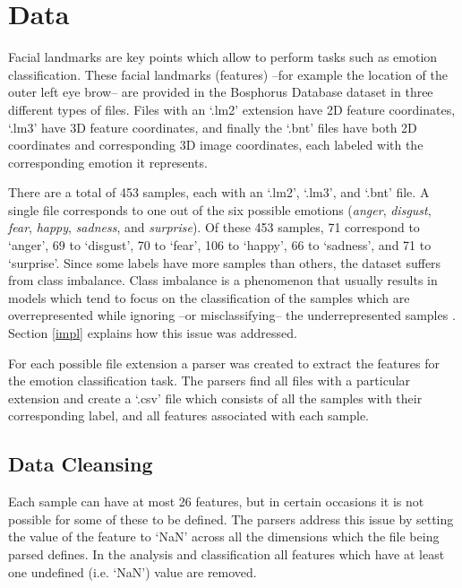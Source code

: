 \section{Data}

Facial landmarks are key points which allow to perform tasks such as emotion classification. These facial landmarks (features) --for example the location of the outer left eye brow-- are provided in the Bosphorus Database dataset in three different types of files. Files with an `.lm2' extension have 2D feature coordinates, `.lm3' have 3D feature coordinates, and finally the `.bnt' files have both 2D coordinates and corresponding 3D image coordinates, each labeled with the corresponding emotion it represents.

There are a total of 453 samples, each with an `.lm2', `.lm3', and `.bnt' file. A single file corresponds to one out of the six possible emotions (\textit{anger}, \textit{disgust}, \textit{fear}, \textit{happy}, \textit{sadness}, and \textit{surprise}). Of these 453 samples, 71 correspond to `anger', 69 to `disgust', 70 to `fear', 106 to `happy', 66 to `sadness', and 71 to `surprise'. Since some labels have more samples than others, the dataset suffers from class imbalance. Class imbalance is a phenomenon that usually results in models which tend to focus on the classification of the samples which are overrepresented while ignoring --or misclassifying-- the underrepresented samples \cite{data-mining-intro}. Section \ref{impl} explains how this issue was addressed.

For each possible file extension a parser was created to extract the features for the emotion classification task. The parsers find all files with a particular extension and create a `.csv' file which consists of all the samples with their corresponding label, and all features associated with each sample.

\subsection{Data Cleansing}

Each sample can have at most 26 features, but in certain occasions it is not possible for some of these to be defined. The parsers address this issue by setting the value of the feature to `NaN' across all the dimensions which the file being parsed defines. In the analysis and classification all features which have at least one undefined (i.e. `NaN') value are removed.

